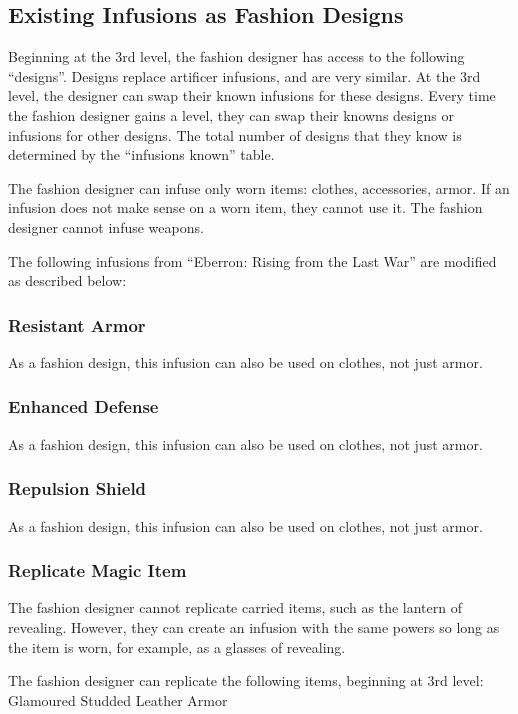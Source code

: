 \documentclass[twocolumn]{dndbook}
\begin{document}
\subsection{Existing Infusions as Fashion Designs}

Beginning at the 3rd level, the fashion designer has access to the following ``designs''.
Designs replace artificer infusions, and are very similar.
At the 3rd level, the designer can swap their known infusions for these designs.
Every time the fashion designer gains a level, they can swap their knowns designs or infusions for other designs.
The total number of designs that they know is determined by the ``infusions known'' table.\par

The fashion designer can infuse only worn items: clothes, accessories, armor.
If an infusion does not make sense on a worn item, they cannot use it.
The fashion designer cannot infuse weapons.\par

The following infusions from ``Eberron: Rising from the Last War'' are modified as described below:
\subsubsection{Resistant Armor}
As a fashion design, this infusion can also be used on clothes, not just armor.

\subsubsection{Enhanced Defense}
As a fashion design, this infusion can also be used on clothes, not just armor.

\subsubsection{Repulsion Shield}
As a fashion design, this infusion can also be used on clothes, not just armor.

\subsubsection{Replicate Magic Item}
The fashion designer cannot replicate carried items, such as the lantern of revealing.
However, they can create an infusion with the same powers so long as the item is worn, for example, as a glasses of revealing.

The fashion designer can replicate the following items, beginning at 3rd level:
Glamoured Studded Leather Armor
\end{document}

